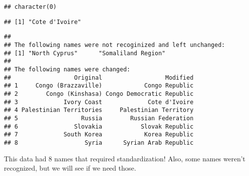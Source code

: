 \documentclass[]{article}
\newenvironment{Shaded}{\begin{snugshade}}{\end{snugshade}}
\newcommand{\CommentTok}[1]{\textcolor[rgb]{0.56,0.35,0.01}{\textit{#1}}}
\newcommand{\DataTypeTok}[1]{\textcolor[rgb]{0.13,0.29,0.53}{#1}}
\newcommand{\KeywordTok}[1]{\textcolor[rgb]{0.13,0.29,0.53}{\textbf{#1}}}
\newcommand{\NormalTok}[1]{#1}
\newcommand{\OperatorTok}[1]{\textcolor[rgb]{0.81,0.36,0.00}{\textbf{#1}}}
\newcommand{\StringTok}[1]{\textcolor[rgb]{0.31,0.60,0.02}{#1}}
\begin{document}
\begin{verbatim}
## character(0)
\end{verbatim}

\begin{Shaded}
\end{Shaded}

\begin{verbatim}
## [1] "Cote d'Ivoire"
\end{verbatim}

\begin{Shaded}
\end{Shaded}

\begin{verbatim}
## 
## The following names were not recoginized and left unchanged:
## [1] "North Cyprus"      "Somaliland Region"
## 
## The following names were changed:
##                  Original                  Modified
## 1     Congo (Brazzaville)            Congo Republic
## 2        Congo (Kinshasa) Congo Democratic Republic
## 3             Ivory Coast             Cote d'Ivoire
## 4 Palestinian Territories     Palestinian Territory
## 5                  Russia        Russian Federation
## 6                Slovakia           Slovak Republic
## 7             South Korea            Korea Republic
## 8                   Syria      Syrian Arab Republic
\end{verbatim}

This data had 8 names that required standardization! Also, some names
weren't recognized, but we will see if we need those.

\begin{Shaded}
\end{Shaded}
\end{document}
